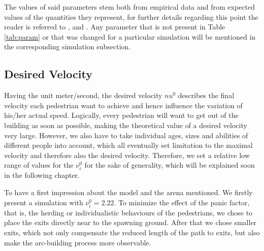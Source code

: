 The values of said parameters stem both from empirical data and from expected values of the quantities they represent, for further details regarding this point the reader is referred to \cite{Helbing2000}, \cite{Zainuddin2010} and \cite{Wang2016}. Any parameter that is not present in Table \ref{tab:param} or that was changed for a particular simulation will be mentioned in the corresponding simulation subsection.


\subsection{Desired Velocity} \label{sec:6.1-velocity}
Having the unit meter/second, the desired velocity $nu^0$  describes the final velocity each pedestrian want to achieve and hence influence the variation of his/her actual speed. Logically, every pedestrian will want to get out of the building as soon as possible, making the theoretical value of a desired velocity very large. However, we also have to take individual ages, sizes and abilities of different people into account, which all eventually set limitation to the maximal velocity and therefore also the desired velocity. Therefore, we set a relative low range of values for the $\nu_i^0$ for the sake of generality, which will be explained soon in the following chapter. 

To have a first impression about the model and the arena mentioned. We firstly present a simulation with $\nu_i^0 = 2.22$. To minimize the effect of the panic factor, that is, the herding or individualistic behaviours of the pedestrians, we chose to place the exits directly near to the spawning ground. After that we chose smaller exits, which not only compensate the reduced length of the path to exits, but also make the arc-building process more observable. 


